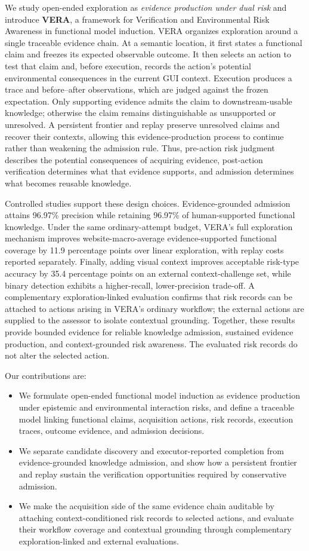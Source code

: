 We study open-ended exploration as \emph{evidence production under dual risk}
and introduce \textbf{VERA}, a framework for Verification and Environmental
Risk Awareness in functional model induction. VERA organizes exploration
around a single traceable evidence chain. At a semantic location, it first
states a functional claim and freezes its expected observable outcome. It then
selects an action to test that claim and, before execution, records the action's
potential environmental consequences in the current GUI context. Execution
produces a trace and before--after observations, which are judged against the
frozen expectation. Only supporting evidence admits the claim to
downstream-usable knowledge; otherwise the claim remains distinguishable as
unsupported or unresolved. A persistent frontier and replay preserve
unresolved claims and recover their contexts, allowing this evidence-production
process to continue rather than weakening the admission rule. Thus, pre-action
risk judgment describes the potential consequences of acquiring evidence,
post-action verification determines what that evidence supports, and admission
determines what becomes reusable knowledge.

Controlled studies support these design choices. Evidence-grounded admission
attains 96.97\% precision while retaining 96.97\% of human-supported functional
knowledge. Under the same ordinary-attempt budget, VERA's full exploration
mechanism improves website-macro-average evidence-supported functional coverage
by 11.9 percentage points over linear exploration, with replay costs reported
separately. Finally, adding visual context improves acceptable risk-type
accuracy by 35.4 percentage points on an external context-challenge set, while
binary detection exhibits a higher-recall, lower-precision trade-off. A
complementary exploration-linked evaluation confirms that risk records can be
attached to actions arising in VERA's ordinary workflow; the external actions
are supplied to the assessor to isolate contextual grounding. Together, these
results provide bounded evidence for reliable knowledge admission, sustained
evidence production, and context-grounded risk awareness. The evaluated risk
records do not alter the selected action.

Our contributions are:
\begin{itemize}
    \item We formulate open-ended functional model induction as evidence
    production under epistemic and environmental interaction risks, and define
    a traceable model linking functional claims, acquisition actions, risk
    records, execution traces, outcome evidence, and admission decisions.
    \item We separate candidate discovery and executor-reported completion from
    evidence-grounded knowledge admission, and show how a persistent frontier
    and replay sustain the verification opportunities required by conservative
    admission.
    \item We make the acquisition side of the same evidence chain auditable by
    attaching context-conditioned risk records to selected actions, and evaluate
    their workflow coverage and contextual grounding through complementary
    exploration-linked and external evaluations.
\end{itemize}
